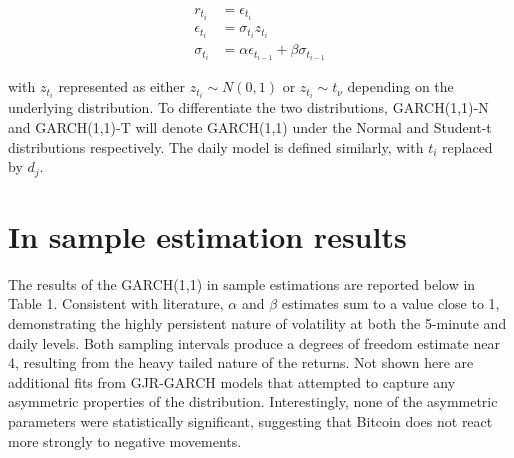 \documentclass[10pt,twoside,printwatermark=false]{pinp}
\begin{document}
\begin{equation}
  \begin{aligned}
r_{t_i}         &= \epsilon_{t_i} \\
\epsilon_{t_i}  &= \sigma_{t_i}  z_{t_i} \\
\sigma_{t_i}    &= \alpha \epsilon_{t_{i-1}}  + \beta \sigma_{t_{i-1}}
       \label{eqn:example} 
  \end{aligned}
\end{equation}

with \(z_{t_i}\) represented as either \(z_{t_i} \sim N(0,1)\) or
\(z_{t_i} \sim t_{\nu}\) depending on the underlying distribution. To
differentiate the two distributions, GARCH(1,1)-N and GARCH(1,1)-T will
denote GARCH(1,1) under the Normal and Student-t distributions
respectively. The daily model is defined similarly, with \(t_i\)
replaced by \(d_j\).

\section{In sample estimation
results}\label{in-sample-estimation-results}

The results of the GARCH(1,1) in sample estimations are reported below
in Table 1. Consistent with literature, \(\alpha\) and \(\beta\)
estimates sum to a value close to 1, demonstrating the highly persistent
nature of volatility at both the 5-minute and daily levels. Both
sampling intervals produce a degrees of freedom estimate near 4,
resulting from the heavy tailed nature of the returns. Not shown here
are additional fits from GJR-GARCH models that attempted to capture any
asymmetric properties of the distribution. Interestingly, none of the
asymmetric parameters were statistically significant, suggesting that
Bitcoin does not react more strongly to negative movements.
\end{document}
